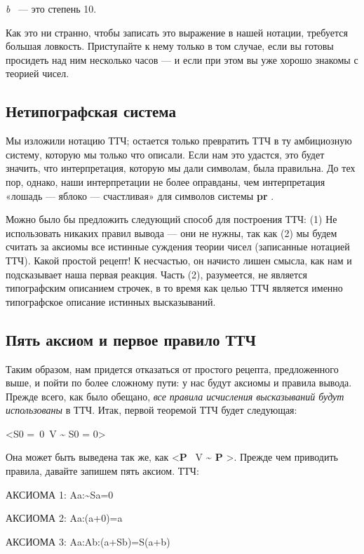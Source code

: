 \documentclass[../main.tex]{subfiles}
\begin{document}
\emph{b} ~--- это степень 10.

Как это ни странно, чтобы записать это выражение в нашей нотации, требуется большая ловкость. Приступайте к нему только в том случае, если вы готовы просидеть над ним несколько часов --- и если при этом вы уже хорошо знакомы с теорией чисел.


\subsection{Нетипографская система}

Мы изложили нотацию ТТЧ; остается только превратить ТТЧ в ту амбициозную систему, которую мы только что описали. Если нам это удастся, это будет значить, что интерпретация, которую мы дали символам, была правильна. До тех пор, однако, наши интерпретации не более оправданы, чем интерпретация «лошадь --- яблоко --- счастливая» для символов системы \textbf{pr} .

Можно было бы предложить следующий способ для построения ТТЧ: (1) Не использовать никаких правил вывода --- они не нужны, так как (2) мы будем считать за аксиомы все истинные суждения теории чисел (записанные нотацией ТТЧ). Какой простой рецепт! К несчастью, он начисто лишен смысла, как нам и подсказывает наша первая реакция. Часть (2), разумеется, не является типографским описанием строчек, в то время как целью ТТЧ является именно типографское описание истинных высказываний.


\subsection{Пять аксиом и первое правило ТТЧ}

Таким образом, нам придется отказаться от простого рецепта, предложенного выше, и пойти по более сложному пути: у нас будут аксиомы и правила вывода. Прежде всего, как было обещано, \emph{все правила исчисления высказываний будут использованы} в ТТЧ. Итак, первой теоремой ТТЧ будет следующая:

\textless S0 =~0~V \textasciitilde{} S0 = 0\textgreater{}

Она может быть выведена так же, как \textless{}\textbf{P} ~V \textbf{\textasciitilde{} P} \textgreater. Прежде чем приводить правила, давайте запишем пять аксиом. ТТЧ:

АКСИОМА 1: Aa:\textasciitilde Sa=0

АКСИОМА 2: Aa:(a+0)=a

АКСИОМА 3: Aa:Ab:(a+Sb)=S(a+b)
\end{document}
